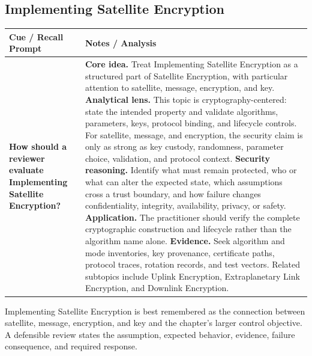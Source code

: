 \documentclass[11pt]{article}
\newcommand{\CornellHeader}{%
\rowcolor{Navy}\color{white}\bfseries Cue / Recall Prompt & \color{white}\bfseries Notes / Analysis\\\hline}
\newcommand{\CornellRow}[2]{%
\cellcolor{CueGray}\RaggedRight\textbf{#1} & \RaggedRight #2\\\hline}
\begin{document}
\subsection*{Implementing Satellite Encryption}
\begin{longtable}{>{\RaggedRight\arraybackslash}p{}|>{\RaggedRight\arraybackslash}p{}}
\CornellHeader
\CornellRow{How should a reviewer evaluate Implementing Satellite Encryption?}{\textbf{Core idea.} Treat Implementing Satellite Encryption as a structured part of Satellite Encryption, with particular attention to satellite, message, encryption, and key. \textbf{Analytical lens.} This topic is cryptography-centered: state the intended property and validate algorithms, parameters, keys, protocol binding, and lifecycle controls. For satellite, message, and encryption, the security claim is only as strong as key custody, randomness, parameter choice, validation, and protocol context. \textbf{Security reasoning.} Identify what must remain protected, who or what can alter the expected state, which assumptions cross a trust boundary, and how failure changes confidentiality, integrity, availability, privacy, or safety. \textbf{Application.} The practitioner should verify the complete cryptographic construction and lifecycle rather than the algorithm name alone. \textbf{Evidence.} Seek algorithm and mode inventories, key provenance, certificate paths, protocol traces, rotation records, and test vectors. Related subtopics include Uplink Encryption, Extraplanetary Link Encryption, and Downlink Encryption.}
\end{longtable}
\begin{topicsummary}
Implementing Satellite Encryption is best remembered as the connection between satellite, message, encryption, and key and the chapter's larger control objective. A defensible review states the assumption, expected behavior, evidence, failure consequence, and required response.
\end{topicsummary}
\end{document}
